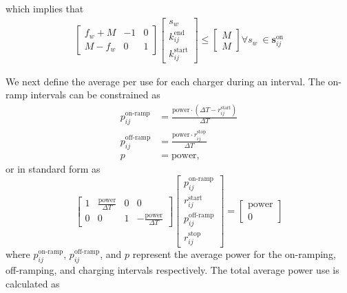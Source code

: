 which implies that
\begin{equation} \begin{aligned}
	\begin{bmatrix}f_w + M & -1 & 0\\ M - f_w & 0 & 1 \end{bmatrix} \begin{bmatrix}s_w \\ k_{ij}^{\text{end}} \\ k_{ij}^{\text{start}} \end{bmatrix} \le \begin{bmatrix} M \\ M \end{bmatrix} \forall s_w \ \in \mathbf{s}_{ij}^{\text{on}}
\end{aligned}\end{equation}
\par We next define the average per use for each charger during an interval. The on-ramp intervals can be constrained as
\begin{equation}\begin{aligned}
	p^{\text{on-ramp}}_{ij} &= \frac{\text{power}\cdot (\Delta T - r^{\text{start}}_{ij})}{\Delta T}\\
	p^{\text{off-ramp}}_{ij} &= \frac{\text{power}\cdot r^{\text{stop}}_{ij}}{\Delta T}\\
	p &= \text{power},
\end{aligned}\end{equation}
or in standard form as
\begin{equation}
	\begin{bmatrix} 1 & \frac{\text{power}}{\Delta T} & 0 & 0 \\ 0 & 0 & 1 & -\frac{\text{power}}{\Delta T}\end{bmatrix} \begin{bmatrix} p^{\text{on-ramp}}_{ij} \\ r_{ij}^{\text{start}} \\ p^{\text{off-ramp}}_{ij} \\ r^{\text{stop}}_{ij} \end{bmatrix} = \begin{bmatrix} \text{power} \\ 0\end{bmatrix}
\end{equation}
where $p_{ij}^{\text{on-ramp}}$, $p_{ij}^{\text{off-ramp}}$, and $p$ represent the average power for the on-ramping, off-ramping, and charging intervals respectively. The total average power use is calculated as 
